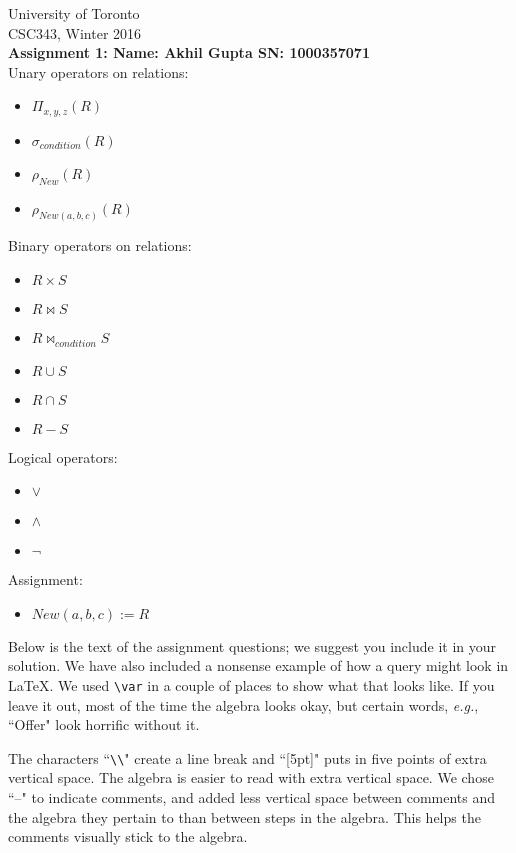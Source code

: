 \documentclass{article}
\newcommand{\var}[1]{\mathit{#1}}
\begin{document}
\noindent
University of Toronto\\
{\sc CSC}343, Winter 2016\\[10pt]
{\LARGE\bf Assignment 1: Name: Akhil Gupta SN: 1000357071} \\[10pt]

\noindent
Unary operators on relations:
\begin{itemize}
\item $\Pi_{x, y, z} (R)$
\item $\sigma_{condition} (R) $
\item $\rho_{New} (R) $
\item $\rho_{New(a, b, c)} (R) $
\end{itemize}
Binary operators on relations:
\begin{itemize}
\item $R \times S$
\item $R \bowtie S$
\item $R \bowtie_{condition} S$
\item $R \cup S$
\item $R \cap S$
\item $R - S$
\end{itemize}
Logical operators:
\begin{itemize}
\item $\vee$
\item $\wedge$
\item $\neg$
\end{itemize}
Assignment:
\begin{itemize}
\item $New(a, b, c) := R$
\end{itemize}

\noindent
Below is the text of the assignment questions; we suggest you include it in your solution.
We have also included a nonsense example of how a query might look in LaTeX.  
We used \verb|\var| in a couple of places to show what that looks like.  
If you leave it out, most of the time the algebra looks okay, but certain words,
{\it e.g.}, ``Offer" look horrific without it.

The characters ``\verb|\\|" create a line break and ``[5pt]" puts in 
five points of extra vertical space.  The algebra is easier to read with extra
vertical space.
We chose ``--" to indicate comments, and added less vertical space between comments
and the algebra they pertain to than between steps in the algebra.
This helps the comments visually stick to the algebra.
\end{document}
